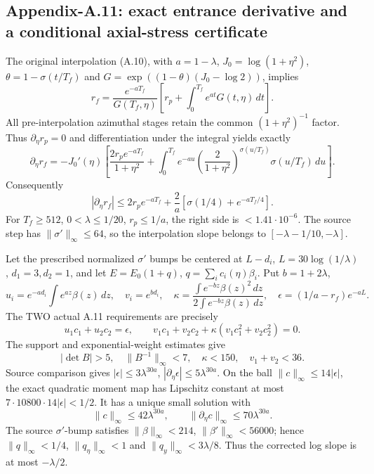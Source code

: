 \subsection*{Appendix-A.11: exact entrance derivative and a conditional axial-stress certificate}
The original interpolation (A.10), with \(a=1-\lambda\),
\(J_0=\log(1+\eta^2)\), \(\theta=1-\sigma(t/T_f)\) and
\(G=\exp((1-\theta)(J_0-\log2))\), implies
\[
r_f=\frac{e^{-aT_f}}{G(T_f,\eta)}
 \left[r_p+\int_0^{T_f}e^{at}G(t,\eta)\,dt\right].
\]
All pre-interpolation azimuthal stages retain the common
\((1+\eta^2)^{-1}\) factor. Thus \(\partial_\eta r_p=0\) and
differentiation under the integral yields exactly
\[
\partial_\eta r_f=-J_0'(\eta)\left[
\frac{2r_pe^{-aT_f}}{1+\eta^2}
+\int_0^{T_f}e^{-au}\left(\frac2{1+\eta^2}\right)^{\sigma(u/T_f)}
                  \sigma(u/T_f)\,du\right].
\]
Consequently
\[
|\partial_\eta r_f|\le 2r_pe^{-aT_f}
  +\frac2a[\sigma(1/4)+e^{-aT_f/4}].
\]
For \(T_f\ge512\), \(0<\lambda\le1/20\),
\(r_p\le1/a\), the right side is \(<1.41\cdot10^{-6}\).
The source step has \(\|\sigma'\|_\infty\le64\), so the
interpolation slope belongs to \([-\lambda-1/10,-\lambda]\).

Let the prescribed normalized \(\sigma'\) bumps be centered
at \(L-d_i\), \(L=30\log(1/\lambda)\),
\(d_1=3,d_2=1\), and let \(E=E_0(1+q)\),
\(q=\sum_ic_i(\eta)\beta_i\). Put \(b=1+2\lambda\),
\[
u_i=e^{-ad_i}\int e^{az}\beta(z)\,dz,\quad
v_i=e^{bd_i},\quad
\kappa=\frac{\int e^{-bz}\beta(z)^2\,dz}
             {2\int e^{-bz}\beta(z)\,dz},\quad
\epsilon=(1/a-r_f)e^{-aL}.
\]
The TWO actual A.11 requirements are precisely
\[
u_1c_1+u_2c_2=\epsilon,\qquad
v_1c_1+v_2c_2+\kappa(v_1c_1^2+v_2c_2^2)=0.
\]
The support and exponential-weight estimates give
\[
|\det B|>5,\quad \|B^{-1}\|_\infty<7,\quad
\kappa<150,\quad v_1+v_2<36.
\]
Source comparison gives \(|\epsilon|\le3\lambda^{30a}\),
\(|\partial_\eta\epsilon|\le5\lambda^{30a}\).
On the ball \(\|c\|_\infty\le14|\epsilon|\), the exact
quadratic moment map has Lipschitz constant at most
\(7\cdot10800\cdot14|\epsilon|<1/2\). It has a unique
small solution with
\[
\|c\|_\infty\le42\lambda^{30a},\qquad
\|\partial_\eta c\|_\infty\le70\lambda^{30a}.
\]
The source \(\sigma'\)-bump satisfies \(\|\beta\|_\infty<214\),
\(\|\beta'\|_\infty<56000\); hence
\(\|q\|_\infty<1/4\), \(\|q_\eta\|_\infty<1\) and
\(\|q_y\|_\infty<3\lambda/8\).
Thus the corrected log slope is at most \(-\lambda/2\).

